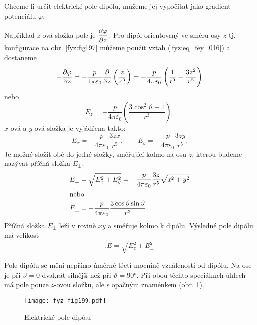   Chceme-li určit elektrické pole dipólu, můžeme jej vypočítat jako gradient potenciálu 
  \(\varphi\).

  Například \(z\)-ová složka pole je \(\dfrac{\partial \varphi}{\partial z}\). Pro dipól orientovaný ve směru osy 
  \(z\) tj. konfigurace na obr. \ref{fyz:fig197} můžeme použít vztah (\ref{fyz:eq_fey_016}) a 
  dostaneme      
  \begin{equation}\label{fyz:eq_fey_021}
  -\dfrac{\partial \varphi}{\partial z}
     = - \frac{p}{4\pi\varepsilon_0}\dfrac{\partial }{\partial z}\left(\dfrac{z}{r^3}\right)
     = - \frac{p}{4\pi\varepsilon_0}\left(\frac{1}{r^3}-\dfrac{3z^2}{r^5}\right) 
  \end{equation}
  nebo
  \begin{equation}\label{fyz:eq_fey_022}
    E_z = - \frac{p}{4\pi\varepsilon_0}\left(\dfrac{3\cos^2\vartheta-1}{r^3}\right),
  \end{equation}
  \(x\)-ová a \(y\)-ová složka je vyjádřena takto:
  \begin{equation}\label{fyz:eq_fey_023}
    E_x = - \frac{p}{4\pi\varepsilon_0}\dfrac{3zx}{r^5}, \qquad
    E_y = - \frac{p}{4\pi\varepsilon_0}\dfrac{3zy}{r^5}.
  \end{equation}
  Je možné složit obě do jedné složky, směřující kolmo na osu \(z\), kterou budeme nazývat 
  příčná složka \(E_\perp\):
  \begin{align}
    E_\perp &= \sqrt{E_x^2 + E_y^2} 
             = - \frac{p}{4\pi\varepsilon_0}\dfrac{3z}{r^5}\sqrt{x^2+y^2} \nonumber \\
    \shortintertext{nebo}
    E_\perp &= - \frac{p}{4\pi\varepsilon_0}\dfrac{3\cos\vartheta\sin\vartheta}{r^3} 
                                                                         \label{fyz:eq_fey_024}
  \end{align}
  Příčná složka \(E_\perp\) leží v rovině \(xy\) a směřuje kolmo k dipólu. Výsledné pole dipólu 
  má velikost
  \begin{equation}\label{fyz:eq_fey_025}.
    E = \sqrt{E_z^2 + E_\perp^2} 
  \end{equation}
  
  Pole dipólu se mění nepřímo úměrně třetí mocnině vzdálenosti od dipólu. Na ose je při 
  \(\vartheta= 0\) dvakrát silnější než při \(\vartheta=\ang{90}\). Při obou těchto 
  speciálních úhlech má pole pouze \(z\)-ovou složku, ale s opačným znaménkem (obr. 
  \ref{fyz:fig199}).
  \begin{figure}[ht!]
    \centering
    \texttt{[image: fyz\_fig199.pdf]}
    \caption{Elektrické pole dipólu}
    \label{fyz:fig199}
  \end{figure}

